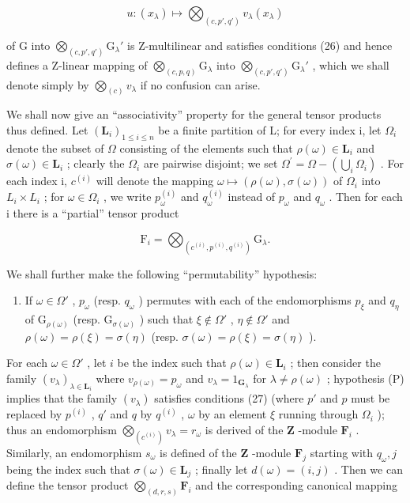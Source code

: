 \[
u: (x _ {\lambda}) \mapsto \bigotimes_ {(c, p', q')} v _ {\lambda} (x _ {\lambda})
\]

of G into \(\bigotimes_{(c, p', q')} \mathrm{G}_{\lambda}'\) is Z-multilinear and satisfies conditions (26) and hence defines a Z-linear mapping of \(\bigotimes_{(c, p, q)} \mathrm{G}_{\lambda}\) into \(\bigotimes_{(c, p', q')} \mathrm{G}_{\lambda}'\) , which we shall denote simply by \(\bigotimes_{(c)} v_{\lambda}\) if no confusion can arise.

We shall now give an ``associativity'' property for the general tensor products thus defined. Let \((\mathbf{L}_{i})_{1\leq i\leq n}\) be a finite partition of L; for every index i, let \(\Omega_{i}\) denote the subset of \(\Omega\) consisting of the elements such that \(\rho(\omega)\in\mathbf{L}_{i}\) and \(\sigma(\omega)\in\mathbf{L}_{i}\) ; clearly the \(\Omega_{i}\) are pairwise disjoint; we set \(\Omega^{\prime}=\Omega-\left(\bigcup_{i}\Omega_{i}\right)\) . For each index i, \(c^{(i)}\) will denote the mapping \(\omega\mapsto(\rho(\omega),\sigma(\omega))\) of \(\Omega_{i}\) into \(L_{i}\times L_{i}\) ; for \(\omega\in\Omega_{i}\) , we write \(p_{\omega}^{(i)}\) and \(q_{\omega}^{(i)}\) instead of \(p_{\omega}\) and \(q_{\omega}\) . Then for each i there is a ``partial'' tensor product

\[
\mathrm{F} _ {i} = \bigotimes_ {(c ^ {(i)}, p ^ {(i)}, q ^ {(i)})} \mathrm{G} _ {\lambda}.
\]

We shall further make the following ``permutability'' hypothesis:

\begin{enumerate}
\def\labelenumi{(\Alph{enumi})}
\setcounter{enumi}{15}
\tightlist
\item
  If \(\omega \in \Omega'\) , \(p_{\omega}\) (resp. \(q_{\omega}\) ) permutes with each of the endomorphisms \(p_{\xi}\) and \(q_{\eta}\) of \(\mathrm{G}_{\rho(\omega)}\) (resp. \(\mathrm{G}_{\sigma(\omega)}\) ) such that \(\xi \notin \Omega'\) , \(\eta \notin \Omega'\) and \(\rho(\omega) = \rho(\xi) = \sigma(\eta)\) (resp. \(\sigma(\omega) = \rho(\xi) = \sigma(\eta)\) ).
\end{enumerate}

For each \(\omega \in \Omega'\) , let \(i\) be the index such that \(\rho(\omega) \in \mathbf{L}_i\) ; then consider the family \((v_{\lambda})_{\lambda \in \mathbf{L}_i}\) where \(v_{\rho(\omega)} = p_{\omega}\) and \(v_{\lambda} = 1_{\mathbf{G}_{\lambda}}\) for \(\lambda \neq \rho(\omega)\) ; hypothesis (P) implies that the family \((v_{\lambda})\) satisfies conditions (27) (where \(p'\) and \(p\) must be replaced by \(p^{(i)}\) , \(q'\) and \(q\) by \(q^{(i)}\) , \(\omega\) by an element \(\xi\) running through \(\Omega_i\) ); thus an endomorphism \(\bigotimes_{(c^{(i)})} v_{\lambda} = r_{\omega}\) is derived of the \(\mathbf{Z}\) -module \(\mathbf{F}_i\) . Similarly, an endomorphism \(s_{\omega}\) is defined of the \(\mathbf{Z}\) -module \(\mathbf{F}_j\) starting with \(q_{\omega}, j\) being the index such that \(\sigma(\omega) \in \mathbf{L}_j\) ; finally let \(d(\omega) = (i,j)\) . Then we can define the tensor product \(\bigotimes_{(d,r,s)} \mathbf{F}_i\) and the corresponding canonical mapping

